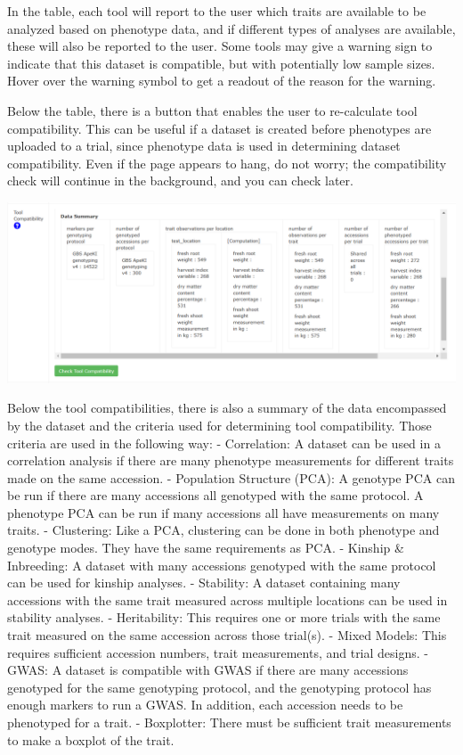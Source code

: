 \documentclass[
  12pt,
]{book}
\begin{document}
In the table, each tool will report to the user which traits are available to be analyzed based on phenotype data, and if different types of analyses are available, these will also be reported to the user. Some tools may give a warning sign to indicate that this dataset is compatible, but with potentially low sample sizes. Hover over the warning symbol to get a readout of the reason for the warning.

Below the table, there is a button that enables the user to re-calculate tool compatibility. This can be useful if a dataset is created before phenotypes are uploaded to a trial, since phenotype data is used in determining dataset compatibility. Even if the page appears to hang, do not worry; the compatibility check will continue in the background, and you can check later.

\begin{center}\includegraphics[width=0.95\linewidth]{assets/images/tool_compatibility_data_summary} \end{center}

Below the tool compatibilities, there is also a summary of the data encompassed by the dataset and the criteria used for determining tool compatibility. Those criteria are used in the following way: - Correlation: A dataset can be used in a correlation analysis if there are many phenotype measurements for different traits made on the same accession. - Population Structure (PCA): A genotype PCA can be run if there are many accessions all genotyped with the same protocol. A phenotype PCA can be run if many accessions all have measurements on many traits. - Clustering: Like a PCA, clustering can be done in both phenotype and genotype modes. They have the same requirements as PCA. - Kinship \& Inbreeding: A dataset with many accessions genotyped with the same protocol can be used for kinship analyses. - Stability: A dataset containing many accessions with the same trait measured across multiple locations can be used in stability analyses. - Heritability: This requires one or more trials with the same trait measured on the same accession across those trial(s). - Mixed Models: This requires sufficient accession numbers, trait measurements, and trial designs. - GWAS: A dataset is compatible with GWAS if there are many accessions genotyped for the same genotyping protocol, and the genotyping protocol has enough markers to run a GWAS. In addition, each accession needs to be phenotyped for a trait. - Boxplotter: There must be sufficient trait measurements to make a boxplot of the trait.
\end{document}
